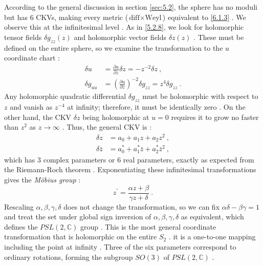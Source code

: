 According to the general discussion in section \ref{sec:5.2}, the sphere has no moduli but has 6 CKVs, making every metric ($\text{diff} \times \text{Weyl}$) equivalent to \eqref{6.1.3} . We observe this at the infinitesimal level . As in \eqref{5.2.8}, we look for holomorphic tensor fields $\delta g_{z z}(z)$ and holomorphic vector fields $\delta z(z)$ . These must be defined on the entire sphere, so we examine the transformation to the $u$ coordinate chart :
\begin{subequations}  \label{6.1.4}
	\begin{align}
		\delta u &=\frac{\partial u}{\partial z} \delta z=-z^{-2} \delta z \:, \label{6.1.4a} \\
		\delta g_{u u} &=\left(\frac{\partial u}{\partial z}\right)^{-2} \delta g_{z z}=z^{4} \delta g_{z z} \:. \label{6.1.4b} 
	\end{align}
\end{subequations}
Any holomorphic quadratic differential $\delta g_{z z}$ must be holomorphic with respect to $z$ and vanish as $z^{-4}$ at infinity; therefore, it must be identically zero . On the other hand, the CKV $\delta z$ being holomorphic at $u=0$ requires it to grow no faster than $z^{2}$ as $z \rightarrow \infty$ . Thus, the general CKV is :
\begin{subequations} \label{6.1.5}
	\begin{align}
		\delta z       &= a_{0}+a_{1} z+a_{2} z^{2}  \:, \label{6.1.5a} \\
		\delta \bar{z} &= a_{0}^{*}+a_{1}^{*} \bar{z}+a_{2}^{*} \bar{z}^{2} \:, \label{6.1.5b}
	\end{align}
\end{subequations}
which has 3 complex parameters or 6 real parameters, exactly as expected from the Riemann-Roch theorem . Exponentiating these infinitesimal transformations gives the \emph{Möbius group} :
\begin{equation}
	z^{\prime}=\frac{\alpha z+\beta}{\gamma z+\delta} \:. \label{6.1.6}
\end{equation}
Rescaling $\alpha, \beta, \gamma, \delta$ does not change the transformation, so we can fix $\alpha \delta-\beta \gamma=1$ and treat the set under global sign inversion of $\alpha, \beta, \gamma, \delta$ as equivalent, which defines the $PSL(2, \mathds{C})$ group . This is the most general coordinate transformation that is holomorphic on the entire $S_2$  . it is a one-to-one mapping including the point at infinity . Three of the six parameters correspond to ordinary rotations, forming the subgroup $SO(3)$ of $PSL(2, \mathds{C})$ .

